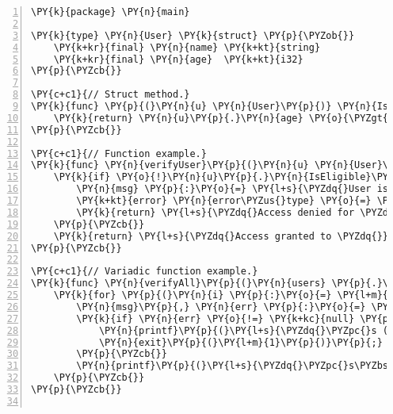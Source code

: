 \begin{Verbatim}[commandchars=\\\{\},numbers=left,firstnumber=1,stepnumber=1]
\PY{k}{package} \PY{n}{main}

\PY{k}{type} \PY{n}{User} \PY{k}{struct} \PY{p}{\PYZob{}}
    \PY{k+kr}{final} \PY{n}{name} \PY{k+kt}{string}
    \PY{k+kr}{final} \PY{n}{age}  \PY{k+kt}{i32}
\PY{p}{\PYZcb{}}

\PY{c+c1}{// Struct method.}
\PY{k}{func} \PY{p}{(}\PY{n}{u} \PY{n}{User}\PY{p}{)} \PY{n}{IsEligible}\PY{p}{(}\PY{p}{)} \PY{k+kt}{bool} \PY{p}{\PYZob{}}
    \PY{k}{return} \PY{n}{u}\PY{p}{.}\PY{n}{age} \PY{o}{\PYZgt{}=} \PY{l+m}{18}\PY{p}{;}
\PY{p}{\PYZcb{}}

\PY{c+c1}{// Function example.}
\PY{k}{func} \PY{n}{verifyUser}\PY{p}{(}\PY{n}{u} \PY{n}{User}\PY{p}{)} \PY{p}{(}\PY{k+kt}{string}\PY{p}{,} \PY{k+kt}{error}\PY{p}{)} \PY{p}{\PYZob{}}
    \PY{k}{if} \PY{o}{!}\PY{n}{u}\PY{p}{.}\PY{n}{IsEligible}\PY{p}{(}\PY{p}{)} \PY{p}{\PYZob{}}
        \PY{n}{msg} \PY{p}{:}\PY{o}{=} \PY{l+s}{\PYZdq{}User is underage\PYZdq{}}\PY{p}{;}
        \PY{k+kt}{error} \PY{n}{error\PYZus{}type} \PY{o}{=} \PY{k+kt}{error}\PY{p}{(}\PY{n}{msg}\PY{p}{)}\PY{p}{;} \PY{c+c1}{// Error is special type of casting.}
        \PY{k}{return} \PY{l+s}{\PYZdq{}Access denied for \PYZdq{}} \PY{o}{+} \PY{n}{u}\PY{p}{.}\PY{n}{name}\PY{p}{,} \PY{n}{error\PYZus{}type}\PY{p}{;}
    \PY{p}{\PYZcb{}}
    \PY{k}{return} \PY{l+s}{\PYZdq{}Access granted to \PYZdq{}} \PY{o}{+} \PY{n}{u}\PY{p}{.}\PY{n}{name}\PY{p}{,} \PY{k+kc}{null}\PY{p}{;} \PY{c+c1}{// Null is a special data type.}
\PY{p}{\PYZcb{}}

\PY{c+c1}{// Variadic function example.}
\PY{k}{func} \PY{n}{verifyAll}\PY{p}{(}\PY{n}{users} \PY{p}{.}\PY{p}{.}\PY{p}{.}\PY{n}{User}\PY{p}{)} \PY{p}{\PYZob{}}
    \PY{k}{for} \PY{p}{(}\PY{n}{i} \PY{p}{:}\PY{o}{=} \PY{l+m}{0}\PY{p}{;} \PY{n}{i} \PY{o}{\PYZlt{}} \PY{n}{len}\PY{p}{(}\PY{n}{users}\PY{p}{)}\PY{p}{;} \PY{n}{i}\PY{o}{++}\PY{p}{)} \PY{p}{\PYZob{}}
        \PY{n}{msg}\PY{p}{,} \PY{n}{err} \PY{p}{:}\PY{o}{=} \PY{n}{verifyUser}\PY{p}{(}\PY{n}{users}\PY{p}{[}\PY{n}{i}\PY{p}{]}\PY{p}{)}\PY{p}{;}
        \PY{k}{if} \PY{n}{err} \PY{o}{!=} \PY{k+kc}{null} \PY{p}{\PYZob{}}
            \PY{n}{printf}\PY{p}{(}\PY{l+s}{\PYZdq{}\PYZpc{}s (error: \PYZpc{}s)\PYZbs{}n\PYZdq{}}\PY{p}{,} \PY{n}{msg}\PY{p}{,} \PY{n}{err}\PY{p}{)}\PY{p}{;}
            \PY{n}{exit}\PY{p}{(}\PY{l+m}{1}\PY{p}{)}\PY{p}{;} \PY{c+c1}{// Exit program with code 1.}
        \PY{p}{\PYZcb{}}
        \PY{n}{printf}\PY{p}{(}\PY{l+s}{\PYZdq{}\PYZpc{}s\PYZbs{}n\PYZdq{}}\PY{p}{,} \PY{n}{msg}\PY{p}{)}\PY{p}{;}
    \PY{p}{\PYZcb{}}
\PY{p}{\PYZcb{}}


\end{Verbatim}
